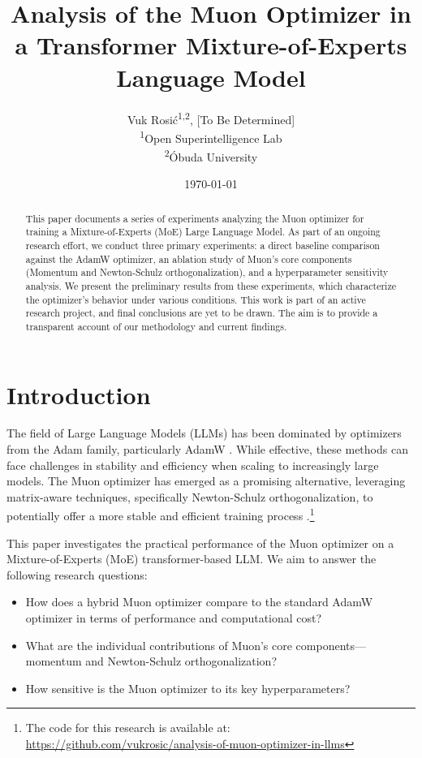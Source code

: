 \documentclass[11pt, a4paper]{article}
\title{\textbf{Analysis of the Muon Optimizer in a Transformer Mixture-of-Experts Language Model}}
\author{
    Vuk Rosić\textsuperscript{1,2}, [To Be Determined] \\
    \textsuperscript{1}Open Superintelligence Lab \\
    \textsuperscript{2}Óbuda University
}
\date{\today}
\begin{document}
\maketitle

\begin{abstract}
This paper documents a series of experiments analyzing the Muon optimizer for training a Mixture-of-Experts (MoE) Large Language Model. As part of an ongoing research effort, we conduct three primary experiments: a direct baseline comparison against the AdamW optimizer, an ablation study of Muon's core components (Momentum and Newton-Schulz orthogonalization), and a hyperparameter sensitivity analysis. We present the preliminary results from these experiments, which characterize the optimizer's behavior under various conditions. This work is part of an active research project, and final conclusions are yet to be drawn. The aim is to provide a transparent account of our methodology and current findings.
\end{abstract}

\section{Introduction}
The field of Large Language Models (LLMs) has been dominated by optimizers from the Adam family, particularly AdamW \cite{loshchilov2017decoupled, kingma2014adam}. While effective, these methods can face challenges in stability and efficiency when scaling to increasingly large models. The Muon optimizer has emerged as a promising alternative, leveraging matrix-aware techniques, specifically Newton-Schulz orthogonalization, to potentially offer a more stable and efficient training process \cite{bernstein2020metricizing, liu2025muon, jordan2024muon}.\footnote{The code for this research is available at: \url{https://github.com/vukrosic/analysis-of-muon-optimizer-in-llms}}

This paper investigates the practical performance of the Muon optimizer on a Mixture-of-Experts (MoE) transformer-based LLM. We aim to answer the following research questions:
\begin{itemize}
    \item How does a hybrid Muon optimizer compare to the standard AdamW optimizer in terms of performance and computational cost?
    \item What are the individual contributions of Muon's core components—momentum and Newton-Schulz orthogonalization?
    \item How sensitive is the Muon optimizer to its key hyperparameters?
\end{itemize}
\end{document}
